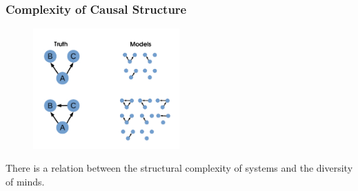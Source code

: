 \documentclass{beamer}
\begin{document}
\begin{frame}
\frametitle{Complexity of Causal Structure}  
\begin{figure}
 \includegraphics[width=0.5\textwidth]{TruthDiversity.pdf}
\end{figure}
There is a relation between the structural complexity of systems and the diversity of minds.
\end{frame}
\end{document}
